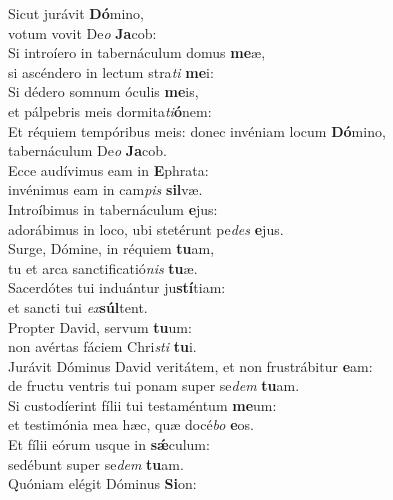 \evenverse Sicut jurávit \textbf{Dó}mino,~\*\\
\evenverse votum vovit De\textit{o} \textbf{Ja}cob:\\
\oddverse Si introíero in tabernáculum domus \textbf{me}æ,~\*\\
\oddverse si ascéndero in lectum stra\textit{ti} \textbf{me}i:\\
\evenverse Si dédero somnum óculis \textbf{me}is,~\*\\
\evenverse et pálpebris meis dormita\textit{ti}\textbf{ó}nem:\\
\oddverse Et réquiem tempóribus meis: donec invéniam locum \textbf{Dó}mino,~\*\\
\oddverse tabernáculum De\textit{o} \textbf{Ja}cob.\\
\evenverse Ecce audívimus eam in \textbf{E}phrata:~\*\\
\evenverse invénimus eam in cam\textit{pis} \textbf{sil}væ.\\
\oddverse Introíbimus in tabernáculum \textbf{e}jus:~\*\\
\oddverse adorábimus in loco, ubi stetérunt pe\textit{des} \textbf{e}jus.\\
\evenverse Surge, Dómine, in réquiem \textbf{tu}am,~\*\\
\evenverse tu et arca sanctificatió\textit{nis} \textbf{tu}æ.\\
\oddverse Sacerdótes tui induántur ju\textbf{stí}tiam:~\*\\
\oddverse et sancti tui \textit{ex}\textbf{súl}tent.\\
\evenverse Propter David, servum \textbf{tu}um:~\*\\
\evenverse non avértas fáciem Chri\textit{sti} \textbf{tu}i.\\
\oddverse Jurávit Dóminus David veritátem, et non frustrábitur \textbf{e}am:~\*\\
\oddverse de fructu ventris tui ponam super se\textit{dem} \textbf{tu}am.\\
\evenverse Si custodíerint fílii tui testaméntum \textbf{me}um:~\*\\
\evenverse et testimónia mea hæc, quæ docé\textit{bo} \textbf{e}os.\\
\oddverse Et fílii eórum usque in \textbf{sǽ}culum:~\*\\
\oddverse sedébunt super se\textit{dem} \textbf{tu}am.\\
\evenverse Quóniam elégit Dóminus \textbf{Si}on:~\*\\
